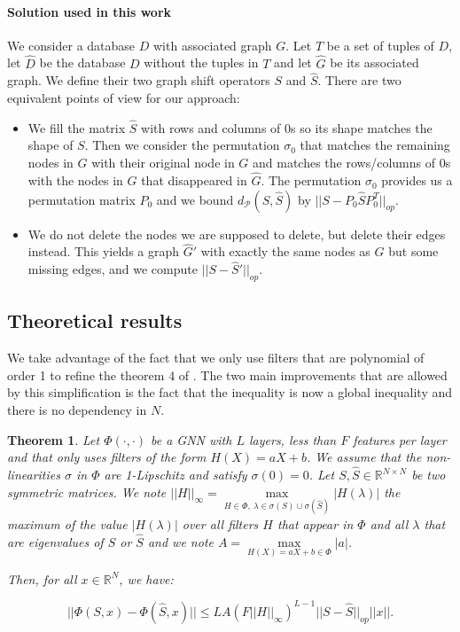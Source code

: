 \documentclass[11pt,a4paper]{article}
\newcommand{\cP}{\mathcal{P}}
\newcommand{\op}[1]{|| #1 ||_{op}}
\newcommand{\ninf}[1]{|| #1 ||_\infty}
\newtheorem{theorem}{Theorem}
\theoremstyle{definition}
\renewcommand{\leq}{\leqslant}
\begin{document}
\paragraph{Solution used in this work} We consider a database $D$ with associated graph $G$. Let $T$ be a set of tuples of $D$, let $\hat{D}$ be the database $D$ without the tuples in $T$ and let $\hat{G}$ be its associated graph. We define their two graph shift operators $S$ and $\hat{S}$. There are two equivalent points of view for our approach:
      
\begin{itemize}
    \item We fill the matrix $\hat{S}$ with rows and columns of $0$s so its shape matches the shape of $S$. Then we consider the permutation $\sigma_0$ that matches the remaining nodes in $\hat{G}$ with their original node in $G$ and matches the rows/columns of $0$s with the nodes in $G$ that disappeared in $\hat{G}$. The permutation $\sigma_0$ provides us a permutation matrix $P_0$ and we bound $d_\cP(S,\hat{S})$ by $||S-P_0 \hat{S} P_0^T||_{op}$.

    \item We do not delete the nodes we are supposed to delete, but delete their edges instead. This yields a graph $\hat{G}'$ with exactly the same nodes as $G$ but some missing edges, and we compute $\op{S-\hat{S}'}$.
\end{itemize}

\subsection{Theoretical results}

    We take advantage of the fact that we only use filters that are polynomial of order 1 to refine the theorem 4 of . The two main improvements that are allowed by this simplification is the fact that the inequality is now a global inequality and there is no dependency in $N$.

    \begin{theorem}
    \label{thm:stability_general}
            Let $\Phi (\cdot , \cdot)$ be a GNN with $L$ layers, less than $F$ features per layer and that only uses filters of the form $H(X) = aX + b$. We assume that the non-linearities $\sigma$ in $\Phi$ are 1-Lipschitz and satisfy $\sigma(0)=0$. Let $S, \hat{S} \in \mathbb{R}^{N \times N}$ be two symmetric matrices. We note $\ninf{H} = \underset{H \in \Phi, \ \lambda \in \sigma(S) \cup \sigma(\hat{S})}{\max} |H(\lambda)|$ the maximum of the value $|H(\lambda)|$ over all filters $H$ that appear in $\Phi$ and all $\lambda$ that are eigenvalues of $S$ or $\hat{S}$ and we note $A = \underset{H(X)=aX+b \in \Phi}{\max} |a|$.

            Then, for all $x \in \mathbb{R}^N$, we have:

                $$|| \Phi (S,x) - \Phi (\hat{S},x) || \leq L A (F \ninf{H} )^ {L-1} \op{S - \hat{S}} ||x||.$$

        \end{theorem}
\end{document}
